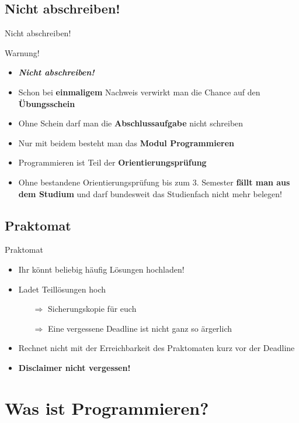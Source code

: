 \documentclass[usepdftitle=false,hyperref={pdfpagelabels=false}]{beamer}
\begin{document}
\subsection{Nicht abschreiben!}
\begin{frame}{Nicht abschreiben!}
\begin{alertblock}{Warnung!}
\begin{itemize}
\item \emph{\textbf{Nicht abschreiben!}}
\item Schon bei \textbf{einmaligem} Nachweis verwirkt man die Chance auf den \textbf{Übungsschein}
\item Ohne Schein darf man die \textbf{Abschlussaufgabe} nicht schreiben
\item Nur mit beidem besteht man das \textbf{Modul Programmieren}
\item Programmieren ist Teil der \textbf{Orientierungsprüfung}
\item Ohne bestandene Orientierungsprüfung bis zum 3. Semester \textbf{fällt man aus dem Studium} und darf bundesweit das Studienfach nicht mehr belegen!
\end{itemize}
\end{alertblock}
\end{frame}

\subsection{Praktomat}
\begin{frame}{Praktomat}
    \begin{itemize}
        \item Ihr könnt beliebig häufig Lösungen hochladen!
        \item Ladet Teillösungen hoch
        \begin{itemize}
            \item[$\Rightarrow$] Sicherungskopie für euch
            \item[$\Rightarrow$] Eine vergessene Deadline ist nicht ganz so ärgerlich
        \end{itemize}
        \item Rechnet nicht mit der Erreichbarkeit des Praktomaten 
              kurz vor der Deadline
        \item \textbf{Disclaimer nicht vergessen!}
    \end{itemize}
\end{frame}

\section{Was ist Programmieren?}
\end{document}
